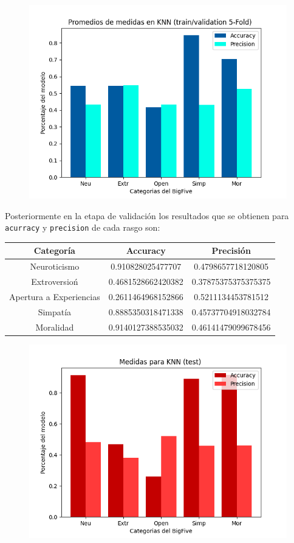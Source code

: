 \documentclass[10pt, a4paper]{article}
\begin{document}
                \begin{figure}[h!]
                    \centering
                    \includegraphics[width = 0.7\linewidth]{bar_knn.png}
                \end{figure}

                Posteriormente en la etapa de validaci\'on los resultados que se obtienen para \texttt{acurracy} y \texttt{precision} de cada rasgo son: 

                \begin{tabular}[h!]{|c|c|c|}

                    \hline Categor\'ia & Accuracy & Precisi\'on \\  
                    \hline Neuroticismo             & 0.910828025477707  & 0.4798657718120805 \\
                    \hline Extroversio\'n           & 0.4681528662420382 & 0.37875375375375375 \\
                    \hline Apertura a Experiencias  & 0.2611464968152866 & 0.5211134453781512 \\
                    \hline Simpat\'ia               & 0.8885350318471338 & 0.45737704918032784 \\
                    \hline Moralidad                & 0.9140127388535032 & 0.46141479099678456 \\
                    \hline
                \end{tabular}
            
                \begin{figure}[h!]
                    \centering
                    \includegraphics[width = 0.7\linewidth]{bar2_knn.png}
                \end{figure}
\end{document}
